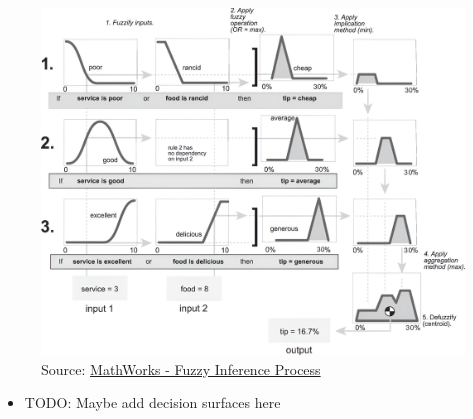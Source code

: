 \documentclass[
	10pt,
	t		%
]{beamer}
\begin{document}
\begin{frame}
	\vspace{-0.8cm}
	\begin{figure}
		\centering
		\caption{\tiny{Source: \href{https://de.mathworks.com/help/fuzzy/fuzzy-inference-process.html}{MathWorks - Fuzzy Inference Process}}}
		\includegraphics[width=0.8\paperwidth]{figures/FullInferenceProcess.png}
	\end{figure}
	\label{fig:fuzzy_inference_full}

\end{frame}


\begin{frame}
	\begin{itemize}
		\item TODO: Maybe add decision surfaces here
	\end{itemize}
\end{frame}
\end{document}
